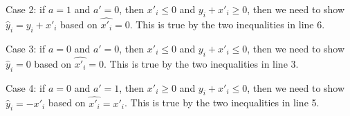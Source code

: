 Case 2: if $a = 1$ and $a' = 0$, then $x'_i \leq 0 $ and $y_i+x'_i\geq 0$, then we need to show $\hat{y}_i = y_i+x'_i$ based on  $\hat{x'_i} = 0$. This is true by the two inequalities in line 6.

Case 3: if $a = 0$ and $a' = 0$, then $x'_i \leq 0 $ and $y_i+x'_i\leq 0$, then we need to show $\hat{y}_i = 0$ based on  $\hat{x'_i} = 0$. This is true by the two inequalities in line 3.


Case 4: if $a = 0$ and $a' = 1$, then $x'_i \geq 0 $ and $y_i+x'_i\leq 0$, then we need to show $\hat{y}_i = -x'_i$ based on  $\hat{x'_i} = x'_i$. This is true by the two inequalities in line 5.
